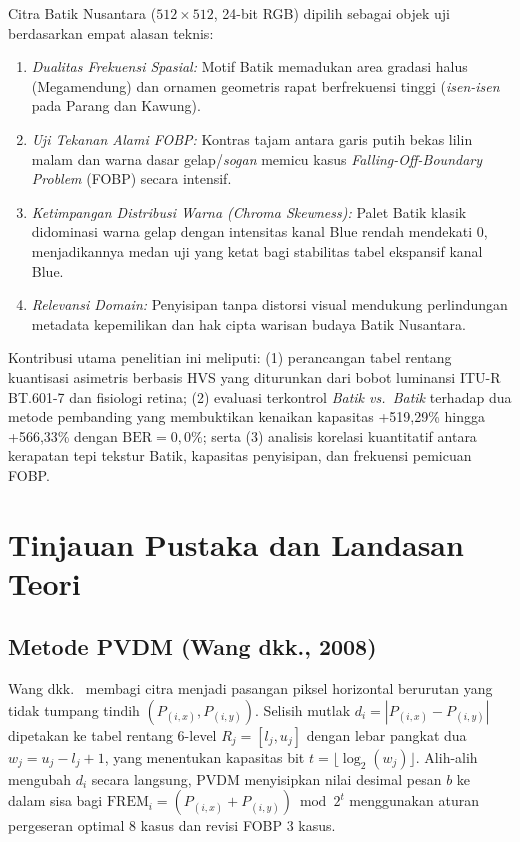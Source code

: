 \documentclass[12pt,journal]{IEEEtran}
\begin{document}
Citra Batik Nusantara ($512 \times 512$, 24-bit RGB) dipilih sebagai objek uji berdasarkan empat alasan teknis:
\begin{enumerate}
    \item \textit{Dualitas Frekuensi Spasial:} Motif Batik memadukan area gradasi halus (Megamendung) dan ornamen geometris rapat berfrekuensi tinggi (\textit{isen-isen} pada Parang dan Kawung).
    \item \textit{Uji Tekanan Alami FOBP:} Kontras tajam antara garis putih bekas lilin malam dan warna dasar gelap/\textit{sogan} memicu kasus \textit{Falling-Off-Boundary Problem} (FOBP) secara intensif.
    \item \textit{Ketimpangan Distribusi Warna (Chroma Skewness):} Palet Batik klasik didominasi warna gelap dengan intensitas kanal Blue rendah mendekati 0, menjadikannya medan uji yang ketat bagi stabilitas tabel ekspansif kanal Blue.
    \item \textit{Relevansi Domain:} Penyisipan tanpa distorsi visual mendukung perlindungan metadata kepemilikan dan hak cipta warisan budaya Batik Nusantara.
\end{enumerate}

Kontribusi utama penelitian ini meliputi: (1) perancangan tabel rentang kuantisasi asimetris berbasis HVS yang diturunkan dari bobot luminansi ITU-R BT.601-7 dan fisiologi retina; (2) evaluasi terkontrol \textit{Batik vs.\ Batik} terhadap dua metode pembanding yang membuktikan kenaikan kapasitas +519,29\% hingga +566,33\% dengan $\text{BER} = 0{,}0\%$; serta (3) analisis korelasi kuantitatif antara kerapatan tepi tekstur Batik, kapasitas penyisipan, dan frekuensi pemicuan FOBP.

\section{Tinjauan Pustaka dan Landasan Teori}

\subsection{Metode PVDM (Wang dkk., 2008)}
Wang dkk.~\cite{wang2008high} membagi citra menjadi pasangan piksel horizontal berurutan yang tidak tumpang tindih $(P_{(i,x)}, P_{(i,y)})$. Selisih mutlak $d_i = |P_{(i,x)} - P_{(i,y)}|$ dipetakan ke tabel rentang 6-level $R_j = [l_j, u_j]$ dengan lebar pangkat dua $w_j = u_j - l_j + 1$, yang menentukan kapasitas bit $t = \lfloor \log_2(w_j) \rfloor$. Alih-alih mengubah $d_i$ secara langsung, PVDM menyisipkan nilai desimal pesan $b$ ke dalam sisa bagi $\text{FREM}_i = (P_{(i,x)} + P_{(i,y)}) \bmod 2^t$ menggunakan aturan pergeseran optimal 8 kasus dan revisi FOBP 3 kasus.
\end{document}
